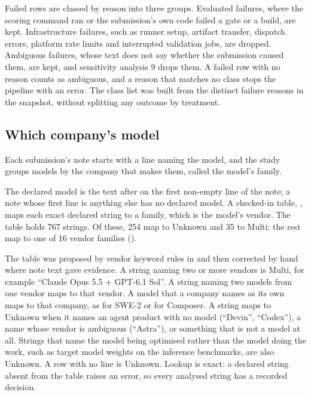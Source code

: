 Failed rows are classed by reason into three groups.
Evaluated failures, where the scoring command ran or the submission's own code failed a gate or a build, are kept.
Infrastructure failures, such as runner setup, artifact transfer, dispatch errors, platform rate limits and interrupted validation jobs, are dropped.
Ambiguous failures, whose text does not say whether the submission caused them, are kept, and sensitivity analysis 9 drops them.
A failed row with no reason counts as ambiguous, and a reason that matches no class stops the pipeline with an error.
The class list was built from the distinct failure reasons in the snapshot, without splitting any outcome by treatment.

\subsection{Which company's model}
\label{sec:labels}

Each submission's note starts with a line naming the model, and the study groups models by the company that makes them, called the model's family.

The declared model is the text after  on the first non-empty line of the note; a note whose first line is anything else has no declared model.
A checked-in table, , maps each exact declared string to a family, which is the model's vendor.
The table holds 767 strings.
Of these, 254 map to Unknown and 35 to Multi; the rest map to one of 16 vendor families ().

The table was proposed by vendor keyword rules in  and then corrected by hand where note text gave evidence.
A string naming two or more vendors is Multi, for example ``Claude Opus 5.5 + GPT-6.1 Sol''.
A string naming two models from one vendor maps to that vendor.
A model that a company names as its own maps to that company, as  for SWE-2 or  for Composer.
A string maps to Unknown when it names an agent product with no model (``Devin'', ``Codex''), a name whose vendor is ambiguous (``Astra''), or something that is not a model at all.
Strings that name the model being optimised rather than the model doing the work, such as target model weights on the inference benchmarks, are also Unknown.
A row with no  line is Unknown.
Lookup is exact: a declared string absent from the table raises an error, so every analysed string has a recorded decision.

